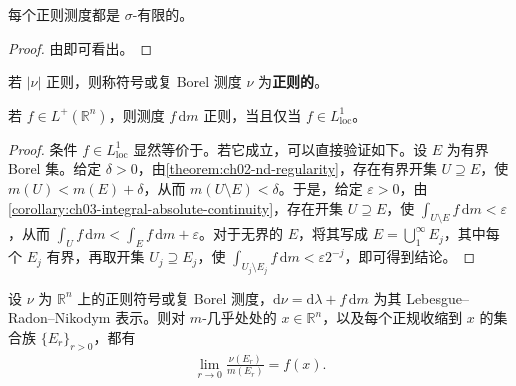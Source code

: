 \documentclass[../../main.tex]{subfiles}%
\begin{document}
\begin{proposition}\label{proposition:ch03-regular-sigma-finite}
每个正则测度都是 $\sigma$-有限的。
\end{proposition}
\begin{proof}
由即可看出。
\end{proof}
\begin{definition}[正则符号测度与复测度]\label{definition:ch03-regular-signed-complex}
若 $|\nu|$ 正则，则称符号或复 Borel 测度 $\nu$ 为\textbf{正则的}。
\end{definition}
\begin{example}\label{example:ch03-regular-density}
若 $f\in L^+(\mathbb{R}^n)$，则测度 $f\,\mathrm{d}m$ 正则，当且仅当 $f\in L^1_{\mathrm{loc}}$。
\end{example}
\begin{proof}
条件 $f\in L^1_{\mathrm{loc}}$ 显然等价于。若它成立，可以直接验证如下。设 $E$ 为有界 Borel 集。给定 $\delta>0$，由\cref{theorem:ch02-nd-regularity}，存在有界开集 $U\supseteq E$，使 $m(U)<m(E)+\delta$，从而 $m(U\setminus E)<\delta$。于是，给定 $\varepsilon>0$，由\cref{corollary:ch03-integral-absolute-continuity}，存在开集 $U\supseteq E$，使 $\int_{U\setminus E}f\,\mathrm{d}m<\varepsilon$，从而 $\int_U f\,\mathrm{d}m<\int_E f\,\mathrm{d}m+\varepsilon$。对于无界的 $E$，将其写成 $E=\bigcup_1^\infty E_j$，其中每个 $E_j$ 有界，再取开集 $U_j\supseteq E_j$，使 $\int_{U_j\setminus E_j}f\,\mathrm{d}m<\varepsilon2^{-j}$，即可得到结论。
\end{proof}
\begin{theorem}\label{theorem:ch03-measure-differentiation}
设 $\nu$ 为 $\mathbb{R}^n$ 上的正则符号或复 Borel 测度，$\mathrm{d}\nu=\mathrm{d}\lambda+f\,\mathrm{d}m$ 为其 Lebesgue–Radon–Nikodym 表示。则对 $m$-几乎处处的 $x\in\mathbb{R}^n$，以及每个正规收缩到 $x$ 的集合族 $\{E_r\}_{r>0}$，都有
\begin{align*}
\lim_{r\to0}\frac{\nu(E_r)}{m(E_r)}=f(x).
\end{align*}
\end{theorem}
\end{document}
